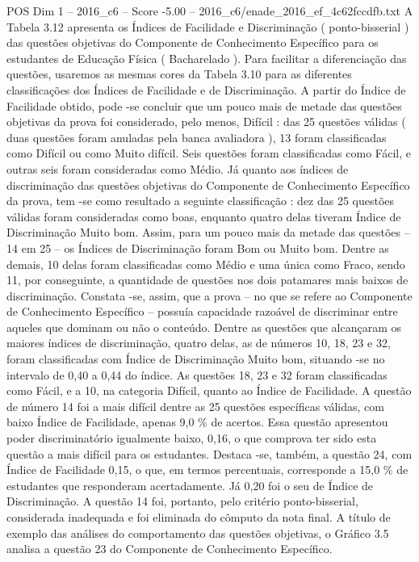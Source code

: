 \begin{textsample}{POS Dim 1 – 2016\_c6 – Score -5.00 – 2016\_c6/enade\_2016\_ef\_4c62fccdfb.txt}
A Tabela 3.12 apresenta os Índices de Facilidade e Discriminação ( ponto-bisserial ) das questões objetivas do Componente de Conhecimento Específico para os estudantes de Educação Física ( Bacharelado ).
Para facilitar a diferenciação das questões, usaremos as mesmas cores da Tabela 3.10 para as diferentes classificações dos Índices de Facilidade e de Discriminação.
A partir do Índice de Facilidade obtido, pode -se concluir que um pouco mais de metade das questões objetivas da prova foi considerado, pelo menos, Difícil : das 25 questões válidas ( duas questões foram anuladas pela banca avaliadora ), 13 foram classificadas como Difícil ou como Muito difícil.
Seis questões foram classificadas como Fácil, e outras seis foram consideradas como Médio.
Já quanto aos índices de discriminação das questões objetivas do Componente de Conhecimento Específico da prova, tem -se como resultado a seguinte classificação : dez das 25 questões válidas foram consideradas como boas, enquanto quatro delas tiveram Índice de Discriminação Muito bom.
Assim, para um pouco mais da metade das questões – 14 em 25 – os Índices de Discriminação foram Bom ou Muito bom.
Dentre as demais, 10 delas foram classificadas como Médio e uma única como Fraco, sendo 11, por conseguinte, a quantidade de questões nos dois patamares mais baixos de discriminação.
Constata -se, assim, que a prova – no que se refere ao Componente de Conhecimento Específico – possuía capacidade razoável de discriminar entre aqueles que dominam ou não o conteúdo.
Dentre as questões que alcançaram os maiores índices de discriminação, quatro delas, as de números 10, 18, 23 e 32, foram classificadas com Índice de Discriminação Muito bom, situando -se no intervalo de 0,40 a 0,44 do índice.
As questões 18, 23 e 32 foram classificadas como Fácil, e a 10, na categoria Difícil, quanto ao Índice de Facilidade.
A questão de número 14 foi a mais difícil dentre as 25 questões específicas válidas, com baixo Índice de Facilidade, apenas 9,0 \% de acertos.
Essa questão apresentou poder discriminatório igualmente baixo, 0,16, o que comprova ter sido esta questão a mais difícil para os estudantes.
Destaca -se, também, a questão 24, com Índice de Facilidade 0,15, o que, em termos percentuais, corresponde a 15,0 \% de estudantes que responderam acertadamente.
Já 0,20 foi o seu de Índice de Discriminação.
A questão 14 foi, portanto, pelo critério ponto-bisserial, considerada inadequada e foi eliminada do cômputo da nota final.
A título de exemplo das análises do comportamento das questões objetivas, o Gráfico 3.5 analisa a questão 23 do Componente de Conhecimento Específico.

\end{textsample}
